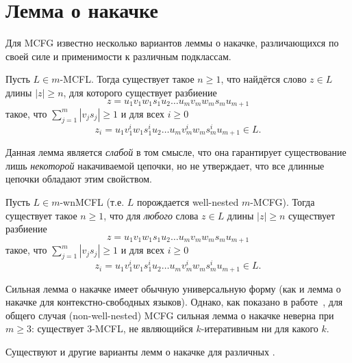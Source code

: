 \section{Лемма о накачке}
\label{sec:MCFG_Pumping}


Для MCFG известно несколько вариантов леммы о накачке, различающихся по своей силе и применимости к различным подклассам.

\begin{theorem}
    \label{thm:pumping_mcfg}
    Пусть $L \in m$-MCFL. Тогда существует такое $n \ge 1$, что найдётся слово $z \in L$ длины $|z| \ge n$, для которого существует разбиение
    \[
    z = u_1 v_1 w_1 s_1 u_2 \ldots u_m v_m w_m s_m u_{m+1}
    \]
    такое, что $\sum_{j=1}^m |v_j s_j| \ge 1$ и для всех $i \ge 0$
    \[
    z_i = u_1 v_1^i w_1 s_1^i u_2 \ldots u_m v_m^i w_m s_m^i u_{m+1} \in L.
    \]
\end{theorem}

Данная лемма является \emph{слабой} в том смысле, что она гарантирует существование лишь \emph{некоторой} накачиваемой цепочки, но не утверждает, что все длинные цепочки обладают этим свойством.

\begin{theorem}
    \label{thm:pumping_wnmcfg}
    Пусть $L \in m$-wnMCFL (т.е. $L$ порождается well-nested $m$-MCFG). Тогда существует такое $n \ge 1$, что для \emph{любого} слова $z \in L$ длины $|z| \ge n$ существует разбиение
    \[
    z = u_1 v_1 w_1 s_1 u_2 \ldots u_m v_m w_m s_m u_{m+1}
    \]
    такое, что $\sum_{j=1}^m |v_j s_j| \ge 1$ и для всех $i \ge 0$
    \[
    z_i = u_1 v_1^i w_1 s_1^i u_2 \ldots u_m v_m^i w_m s_m^i u_{m+1} \in L.
    \]
\end{theorem}

Сильная лемма о накачке имеет обычную универсальную форму (как и лемма о накачке для контекстно-свободных языков).
Однако, как показано в работе~, для общего случая (non-well-nested) MCFG сильная лемма о накачке неверна при $m \ge 3$: существует $3$-MCFL, не являющийся $k$-итеративным ни для какого $k$.

Существуют и другие варианты лемм о накачке для различных .
